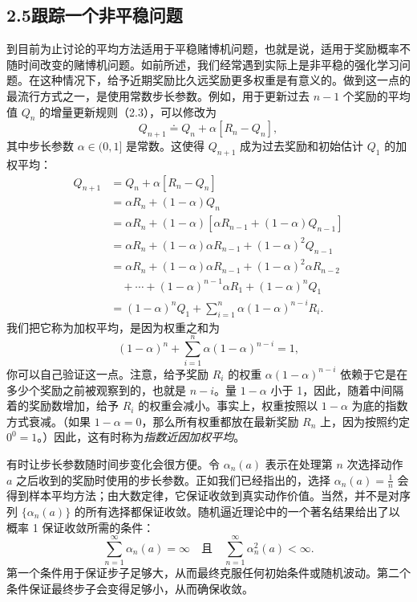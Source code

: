 \documentclass[UTF8, 12pt, fontset=fandol, oneside]{ctexart}
\begin{document}
\subsection*{2.5\quad 跟踪一个非平稳问题}

到目前为止讨论的平均方法适用于平稳赌博机问题，也就是说，适用于奖励概率不随时间改变的赌博机问题。如前所述，我们经常遇到实际上是非平稳的强化学习问题。在这种情况下，给予近期奖励比久远奖励更多权重是有意义的。做到这一点的最流行方式之一，是使用常数步长参数。例如，用于更新过去 $n-1$ 个奖励的平均值 $Q_n$ 的增量更新规则（2.3），可以修改为
\begin{equation}
Q_{n+1}\doteq Q_n+\alpha\left[R_n-Q_n\right],
\tag{2.5}
\end{equation}
其中步长参数 $\alpha\in(0,1]$ 是常数。这使得 $Q_{n+1}$ 成为过去奖励和初始估计 $Q_1$ 的加权平均：
\begin{equation}
\begin{aligned}
Q_{n+1}
&= Q_n+\alpha\left[R_n-Q_n\right]\\
&= \alpha R_n+(1-\alpha)Q_n\\
&= \alpha R_n+(1-\alpha)\left[\alpha R_{n-1}+(1-\alpha)Q_{n-1}\right]\\
&= \alpha R_n+(1-\alpha)\alpha R_{n-1}+(1-\alpha)^2Q_{n-1}\\
&= \alpha R_n+(1-\alpha)\alpha R_{n-1}+(1-\alpha)^2\alpha R_{n-2}\\
&\quad+\cdots+(1-\alpha)^{n-1}\alpha R_1+(1-\alpha)^nQ_1\\
&= (1-\alpha)^nQ_1+\sum_{i=1}^{n}\alpha(1-\alpha)^{n-i}R_i.
\end{aligned}
\tag{2.6}
\end{equation}
我们把它称为加权平均，是因为权重之和为
\[
(1-\alpha)^n+\sum_{i=1}^{n}\alpha(1-\alpha)^{n-i}=1,
\]
你可以自己验证这一点。注意，给予奖励 $R_i$ 的权重 $\alpha(1-\alpha)^{n-i}$ 依赖于它是在多少个奖励之前被观察到的，也就是 $n-i$。量 $1-\alpha$ 小于 1，因此，随着中间隔着的奖励数增加，给予 $R_i$ 的权重会减小。事实上，权重按照以 $1-\alpha$ 为底的指数方式衰减。（如果 $1-\alpha=0$，那么所有权重都放在最新奖励 $R_n$ 上，因为按照约定 $0^0=1$。）因此，这有时称为\emph{指数近因加权平均}。

有时让步长参数随时间步变化会很方便。令 $\alpha_n(a)$ 表示在处理第 $n$ 次选择动作 $a$ 之后收到的奖励时使用的步长参数。正如我们已经指出的，选择 $\alpha_n(a)=\frac{1}{n}$ 会得到样本平均方法；由大数定律，它保证收敛到真实动作价值。当然，并不是对序列 $\{\alpha_n(a)\}$ 的所有选择都保证收敛。随机逼近理论中的一个著名结果给出了以概率 1 保证收敛所需的条件：
\begin{equation}
\sum_{n=1}^{\infty}\alpha_n(a)=\infty
\quad\text{且}\quad
\sum_{n=1}^{\infty}\alpha_n^2(a)<\infty.
\tag{2.7}
\end{equation}
第一个条件用于保证步子足够大，从而最终克服任何初始条件或随机波动。第二个条件保证最终步子会变得足够小，从而确保收敛。
\end{document}
